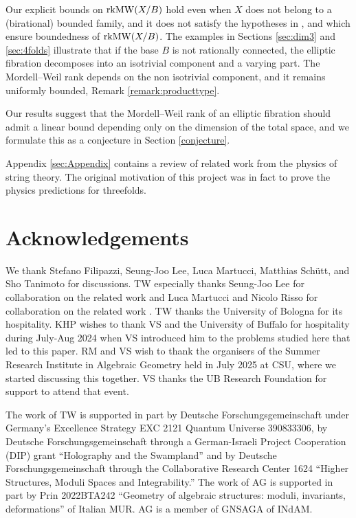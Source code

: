 \documentclass[11pt]{amsart}
\theoremstyle{definition}
\theoremstyle{definition}
\theoremstyle{remark}
\theoremstyle{remark}
\theoremstyle{definition}
\theoremstyle{conjecture}
\newcommand{\MW}{\mathrm{MW}}
\begin{document}
Our  explicit bounds on ${\rm rk} \MW(X/B)$ hold  even when  $X$ does not belong to a (birational) bounded family, and  it does not satisfy the hypotheses in  \cite{Filipazzi:2021dcw}, \cite{DiCerboSvaldi} and \cite{Birkar_2024}  which ensure boundedness of ${\rm rk} \MW(X/B)$. 
The examples in Sections \ref{sec:dim3} and \ref{sec:4folds} illustrate that if  the base $B$ is not  rationally connected, the elliptic fibration decomposes  
into an  isotrivial component and a  varying part. 
The Mordell–Weil rank depends on the non isotrivial component, and it remains uniformly bounded, 
Remark \ref{remark:producttype}. 
\color{black}

Our results suggest that the Mordell–Weil rank of an elliptic fibration should admit a linear bound depending only on the dimension of the total space, and we formulate this as a conjecture in Section \ref{conjecture}. 


Appendix \ref{sec:Appendix} contains a review of related work from the physics of string theory. The original motivation of this project was  in fact to prove the physics predictions for threefolds.

\color{black}


\section*{Acknowledgements}
We thank Stefano Filipazzi, Seung-Joo Lee, Luca Martucci, Matthias Schütt, and  Sho Tanimoto for discussions. 
TW especially thanks Seung-Joo Lee for collaboration on the related work \cite{Lee:2018ihr, Lee:2019skh} and Luca Martucci and Nicolo Risso for collaboration on the related work \cite{Martucci:2022krl}.
TW thanks the University of Bologna for its hospitality. KHP wishes to thank VS and the University of Buffalo for hospitality during July-Aug 2024 when VS introduced him to the problems studied here that led to this paper.
RM and VS wish to thank the organisers of the Summer Research Institute in Algebraic Geometry held in July 2025 at CSU, where we started discussing this together. 
VS thanks the UB Research Foundation for support to attend that event.

The work of TW is supported in part by Deutsche Forschungsgemeinschaft under Germany’s Excellence Strategy EXC 2121 Quantum Universe 390833306, by Deutsche Forschungsgemeinschaft through a German-Israeli Project Cooperation (DIP) grant “Holography and the Swampland” and by Deutsche Forschungsgemeinschaft through the Collaborative Research Center 1624 “Higher Structures, Moduli Spaces and Integrability.” 
The work of AG is supported in part by 
Prin 2022BTA242 ``Geometry of algebraic structures: moduli, invariants, deformations'' of Italian MUR. AG is a member of GNSAGA of  INdAM. 
\end{document}
